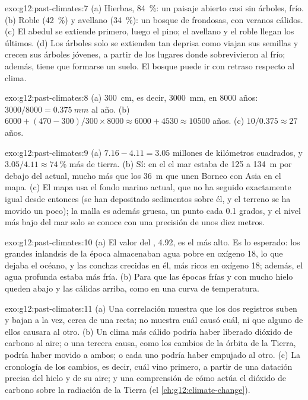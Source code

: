 \begin{solution}{exo:g12:past-climates:7}
(a) Hierbas, \qty{84}{\percent}: un paisaje abierto casi sin árboles, frío.
(b) Roble (\qty{42}{\percent}) y avellano (\qty{34}{\percent}): un bosque de
frondosas, con veranos cálidos. (c) El abedul se extiende primero, luego el pino; el avellano y el roble
llegan los últimos. (d) Los árboles solo se extienden tan deprisa como viajan sus semillas y crecen sus
árboles jóvenes, a partir de los lugares donde sobrevivieron al frío; además, tiene
que formarse un suelo. El bosque puede ir con retraso respecto al clima.
\end{solution}

\begin{solution}{exo:g12:past-climates:8}
(a) \qty{300}{cm}, es decir, \qty{3000}{mm}, en \num{8000} años: $3000/8000 =
\qty{0.375}{mm}$ al año. (b) $\num{6000} + (470 - 300)/300 \times \num{8000}
\approx \num{6000} + \num{4530} \approx \num{10500}$ años. (c) $10/0.375
\approx 27$ años.
\end{solution}

\begin{solution}{exo:g12:past-climates:9}
(a) $7.16 - 4.11 = 3.05$ millones de kilómetros cuadrados, y $3.05/4.11 \approx
\qty{74}{\percent}$ más de tierra. (b) Sí: en el  el mar
estaba de 125 a \qty{134}{m} por debajo del actual, mucho más que los \qty{36}{m}
que unen Borneo con Asia en el mapa. (c) El mapa usa el fondo marino actual, que no ha
seguido exactamente igual desde entonces (se han depositado sedimentos sobre él, y el
terreno se ha movido un poco); la malla es además gruesa, un punto cada 0.1
grados, y el nivel más bajo del mar solo se conoce con una precisión de unos diez metros.
\end{solution}

\begin{solution}{exo:g12:past-climates:10}
(a) El valor del , \qty{4.92}{\permil}, es el
más alto. Es lo esperado: los grandes inlandsis de la época almacenaban agua pobre
en oxígeno 18, lo que dejaba el océano, y las conchas crecidas en él, más ricos en
oxígeno 18; además, el agua profunda estaba más fría. (b) Para que las épocas frías y con mucho hielo queden
abajo y las cálidas arriba, como en una curva de temperatura.
\end{solution}

\begin{solution}{exo:g12:past-climates:11}
(a) Una correlación muestra que los dos registros suben y bajan a la vez, cerca
de una recta; no muestra cuál causó cuál, ni que alguno de ellos causara
al otro. (b) Un clima más cálido podría haber liberado dióxido de carbono al aire;
o una tercera causa, como los cambios de la órbita de la Tierra, podría haber movido
a ambos; o cada uno podría haber empujado al otro. (c) La cronología de los cambios,
es decir, cuál vino primero, a partir de una datación precisa del hielo y de su aire; y una
comprensión de cómo actúa el dióxido de carbono sobre la radiación de la Tierra
(el \cref{ch:g12:climate-change}).
\end{solution}

